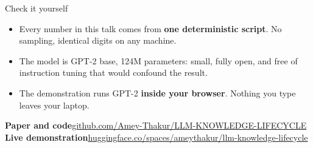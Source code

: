 \documentclass[aspectratio=169]{beamer}
\begin{document}
\begin{frame}{Check it yourself}
  \vspace{0.4cm}
  \begin{itemize}\setlength\itemsep{0.9em}
    \item Every number in this talk comes from \textbf{one deterministic script}.
          No sampling, identical digits on any machine.
    \item The model is GPT-2 base, 124M parameters: small, fully open, and free of
          instruction tuning that would confound the result.
    \item The demonstration runs GPT-2 \textbf{inside your browser}. Nothing you type
          leaves your laptop.
  \end{itemize}
  \vspace{1.2em}
  \begin{center}\footnotesize
    \textbf{Paper and code}\quad \href{https://github.com/Amey-Thakur/LLM-KNOWLEDGE-LIFECYCLE}{github.com/Amey-Thakur/LLM-KNOWLEDGE-LIFECYCLE}\\[2.5mm]
    \textbf{Live demonstration}\quad \href{https://huggingface.co/spaces/ameythakur/llm-knowledge-lifecycle}{huggingface.co/spaces/ameythakur/llm-knowledge-lifecycle}
  \end{center}
\end{frame}
\end{document}
